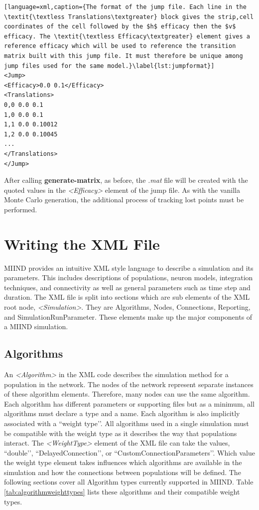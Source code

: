 \documentclass[utf8]{frontiersSCNS} %
\begin{document}
\begin{lstlisting}[language=xml,caption={The format of the jump file. Each line in the  \textit{\textless Translations\textgreater} block gives the strip,cell coordinates of the cell followed by the $h$ efficacy then the $v$ efficacy. The \textit{\textless Efficacy\textgreater} element gives a reference efficacy which will be used to reference the transition matrix built with this jump file. It must therefore be unique among jump files used for the same model.}\label{lst:jumpformat}]
<Jump>
<Efficacy>0.0 0.1</Efficacy>
<Translations>
0,0	0.0	0.1
1,0	0.0	0.1
1,1	0.0	0.10012
1,2	0.0	0.10045
...
</Translations>
</Jump>
\end{lstlisting}

After calling \textbf{generate-matrix}, as before, the \textit{.mat} file will be created with the quoted values in the \textit{\textless Efficacy\textgreater} element of the jump file. As with the vanilla Monte Carlo generation, the additional process of tracking lost points must be performed.  \\

\section{Writing the XML File}
\label{section:xmlfile}
MIIND provides an intuitive XML style language to describe a simulation and its parameters. This includes descriptions of populations, neuron models, integration techniques, and connectivity as well as general parameters such as time step and duration. The XML file is split into sections which are sub elements of the XML root node, \textit{\textless Simulation\textgreater}. They are Algorithms, Nodes, Connections, Reporting, and SimulationRunParameter. These elements make up the major components of a MIIND simulation.\\

\subsection{Algorithms}

An \textit{\textless Algorithm\textgreater} in the XML code describes the simulation method for a population in the network. The nodes of the network represent separate instances of these algorithm elements. Therefore, many nodes can use the same algorithm. Each algorithm has different parameters or supporting files but as a minimum, all algorithms must declare a type and a name. Each algorithm is also implicitly associated with a ``weight type’’. All algorithms used in a single simulation must be compatible with the weight type as it describes the way that populations interact. The \textit{\textless WeightType\textgreater} element of the XML file can take the values, ``double’’, ``DelayedConnection’’, or ``CustomConnectionParameters’’. Which value the weight type element takes influences which algorithms are available in the simulation and how the connections between populations will be defined. The following sections cover all Algorithm types currently supported in MIIND. Table \ref{tab:algorithmweighttypes} lists these algorithms and their compatible weight types.\\
\end{document}
